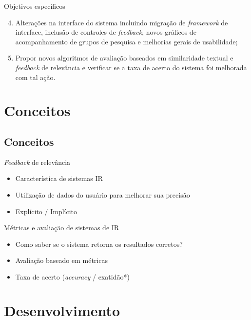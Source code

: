 \documentclass{beamer}
\begin{document}
\begin{frame}{Objetivos específicos}
  \begin{enumerate}[<+->]
    \setcounter{enumi}{3}

    \item Alterações na interface do sistema incluindo migração de \textit{framework} de interface, inclusão de controles de \textit{feedback}, novos gráficos de acompanhamento de grupos de pesquisa e melhorias gerais de usabilidade;

    \item Propor novos algoritmos de avaliação baseados em similaridade textual e \textit{feedback} de relevância e verificar se a taxa de acerto do sistema foi melhorada com tal ação.
  \end{enumerate}
\end{frame}

\section{Conceitos}
\subsection*{Conceitos}

\begin{frame}{\textit{Feedback} de relevância}
  \begin{itemize}
    \item Característica de sistemas IR
    \item Utilização de dados do usuário para melhorar sua precisão
    \item Explícito / Implícito
  \end{itemize}
\end{frame}

\begin{frame}{Métricas e avaliação de sistemas de IR}
  \begin{itemize}
    \item Como saber se o sistema retorna os resultados corretos?
    \item Avaliação baseado em métricas
    \item Taxa de acerto (\textit{accuracy} / exatidão*)
  \end{itemize}
\end{frame}

\section{Desenvolvimento}
\end{document}
